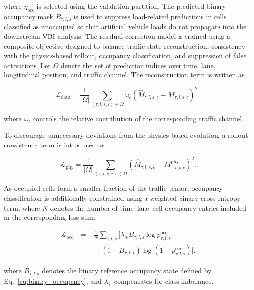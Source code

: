 \documentclass[journal]{IEEEtran}
\begin{document}
where $\eta_{\mathrm{occ}}$ is selected using the validation partition. The predicted binary occupancy mask \(\hat B_{\tau,l,s}\) is used to suppress load-related predictions in cells classified as unoccupied so that artificial vehicle loads do not propagate into the downstream VBI analysis.
The residual correction model is trained using a composite objective designed to balance traffic-state reconstruction, consistency with the physics-based rollout, occupancy classification, and suppression of false activations. Let $\Omega$ denote the set of prediction indices over time, lane, longitudinal position, and traffic channel. The reconstruction term is written as

\begin{equation}
\mathcal{L}_{\mathrm{data}}
=
\frac{1}{|\Omega|}
\sum_{(\tau,l,s,c)\in\Omega}
\omega_c
\left(
\widehat{M}_{\tau,l,s,c}
-
M_{\tau,l,s,c}
\right)^2,
\end{equation}

where $\omega_c$ controls the relative contribution of the corresponding traffic channel.

To discourage unnecessary deviations from the physics-based evolution, a rollout-consistency term is introduced as

\begin{equation}
\mathcal{L}_{\mathrm{phy}}
=
\frac{1}{|\Omega|}
\sum_{(\tau,l,s,c)\in\Omega}
\left(
\widehat{M}_{\tau,l,s,c}
-
M_{\tau,l,s,c}^{\mathrm{phy}}
\right)^2.
\end{equation}

As occupied cells form a smaller fraction of the traffic tensor, occupancy classification is additionally constrained using a weighted binary cross-entropy term, where $N$ denotes the number of time--lane--cell occupancy entries included in the corresponding loss sum.

\begin{equation}
\begin{aligned}
\mathcal{L}_{\mathrm{occ}}
&=
-
\frac{1}{N}
\sum_{\tau,l,s}
\Bigg[
\lambda_{+}
B_{\tau,l,s}
\log
p_{\tau,l,s}^{\mathrm{occ}}
\\
&\qquad+
\left(
1-B_{\tau,l,s}
\right)
\log
\left(
1-p_{\tau,l,s}^{\mathrm{occ}}
\right)
\Bigg].
\end{aligned}
\end{equation}

where $B_{\tau,l,s}$ denotes the binary reference occupancy state defined by
Eq.~\eqref{eq:binary_occupancy}, and $\lambda_{+}$ compensates for class imbalance.
\end{document}
